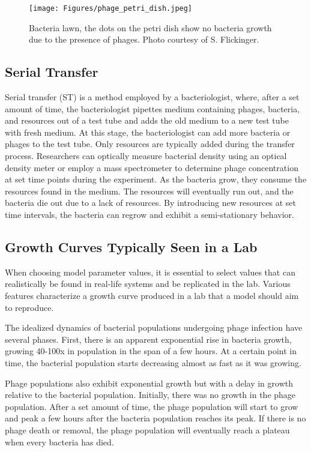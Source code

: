 \begin{figure}[h!]
    \texttt{[image: Figures/phage\_petri\_dish.jpeg]}
    \centering
    \caption{
        Bacteria lawn, the dots on the petri dish show no bacteria growth due to the presence of phages. 
        Photo courtesy of S. Flickinger. 
    }
    \label{fig:phage_petri_dish}
\end{figure}

\subsection{Serial Transfer}
Serial transfer (ST) is a method employed by a bacteriologist, where, after a set amount of time, the bacteriologist pipettes medium containing phages, bacteria, and resources out of a test tube and adds the old medium to a new test tube with fresh medium.
At this stage, the bacteriologist can add more bacteria or phages to the test tube. 
Only resources are typically added during the transfer process. 
Researchers can optically measure bacterial density using an optical density meter or employ a mass spectrometer to determine phage concentration at set time points during the experiment. 
As the bacteria grow, they consume the resources found in the medium.
The resources will eventually run out, and the bacteria die out due to a lack of resources.
By introducing new resources at set time intervals, the bacteria can regrow and exhibit a semi-stationary behavior.

\subsection{Growth Curves Typically Seen in a Lab}
\label{sec:literaturereview:growth_curves_typically_seen_in_a_lab}
When choosing model parameter values, it is essential to select values that can realistically be found in real-life systems and be replicated in the lab. 
Various features characterize a growth curve produced in a lab that a model should aim to reproduce. 

The idealized dynamics of bacterial populations undergoing phage infection have several phases. 
First, there is an apparent exponential rise in bacteria growth, growing 40-100x in population in the span of a few hours. 
At a certain point in time, the bacterial population starts decreasing almost as fast as it was growing. 

Phage populations also exhibit exponential growth but with a delay in growth relative to the bacterial population. 
Initially, there was no growth in the phage population. 
After a set amount of time, the phage population will start to grow and peak a few hours after the bacteria population reaches its peak. 
If there is no phage death or removal, the phage population will eventually reach a plateau when every bacteria has died. 

